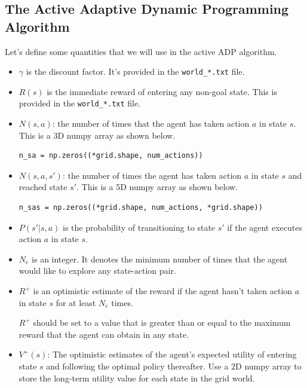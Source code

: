\documentclass[12pt]{article}
\begin{document}
\newpage
\subsection{The Active Adaptive Dynamic Programming Algorithm}
\label{sec:active_adp}

Let's define some quantities that we will use in the active ADP algorithm.
\begin{itemize}

\item $\gamma$ is the discount factor. It's provided in the \verb+world_*.txt+ file.

\item $R(s)$ is the immediate reward of entering any non-goal state. This is provided in the \verb+world_*.txt+ file.

\item $N(s,a)$: the number of times that the agent has taken action $a$ in state $s$. This is a 3D numpy array as shown below.

\begin{verbatim}
n_sa = np.zeros((*grid.shape, num_actions))  
\end{verbatim}

\item $N(s,a,s')$: the number of times the agent has taken action $a$ in state $s$ and reached state $s'$. This is a 5D numpy array as shown below.

\begin{verbatim}
n_sas = np.zeros((*grid.shape, num_actions, *grid.shape))      
\end{verbatim}

\item $P(s'|s,a)$ is the probability of transitioning to state $s'$ if the agent executes action $a$ in state $s$. 
\item 
$N_e$ is an integer. It denotes the minimum number of times that the agent would like to explore any state-action pair. 

\item 
$R^+$ is an optimistic estimate of the reward if the agent hasn't taken action $a$ in state $s$ for at least $N_e$ times. 

$R^+$ should be set to a value that is greater than or equal to the maximum reward that the agent can obtain in any state.

\item $V^+(s)$: The optimistic estimates of the agent's expected utility of entering state $s$ and following the optimal policy thereafter. Use a 2D numpy array to store the long-term utility value for each state in the grid world.
\end{itemize}
\end{document}
